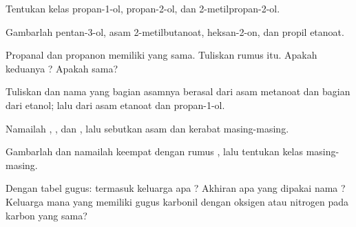 \begin{exercise}[$\star$]\label{exo:g11:functional-groups:5}
Tentukan kelas propan-1-ol, propan-2-ol, dan 2-metilpropan-2-ol.
\end{exercise}

\begin{exercise}[$\star\star$]\label{exo:g11:functional-groups:6}
Gambarlah  pentan-3-ol, asam 2-metilbutanoat,
heksan-2-on, dan propil etanoat.
\end{exercise}

\begin{exercise}[$\star\star$]\label{exo:g11:functional-groups:7}
Propanal dan propanon memiliki  yang sama. Tuliskan rumus
itu. Apakah keduanya ? Apakah  sama?
\end{exercise}

\begin{exercise}[$\star\star$]\label{exo:g11:functional-groups:8}
Tuliskan  dan nama  yang bagian asamnya
berasal dari asam metanoat  dan bagian  dari etanol;
lalu  dari asam etanoat dan propan-1-ol.
\end{exercise}

\begin{exercise}[$\star\star$]\label{exo:g11:functional-groups:9}
Namailah  , , dan
, lalu sebutkan asam dan  kerabat masing-masing.
\end{exercise}

\begin{exercise}[$\star\star$]\label{exo:g11:functional-groups:10}
Gambarlah dan namailah keempat  dengan rumus , lalu
tentukan kelas masing-masing.
\end{exercise}

\begin{exercise}[$\star\star$]\label{exo:g11:functional-groups:11}
Dengan tabel gugus: termasuk keluarga apa ? Akhiran apa
yang dipakai nama ? Keluarga mana yang memiliki gugus karbonil
dengan  oksigen atau nitrogen pada karbon yang sama?
\end{exercise}

